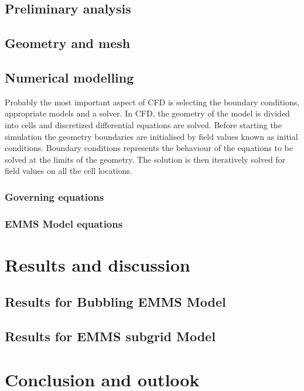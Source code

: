 \documentclass[sprache=english,doktyp=marbeit,fontsize=12pt]{TUBAFarbeiten}
\begin{document}
\subsection{Preliminary analysis}

\subsection{Geometry and mesh}


\subsection{Numerical modelling}

Probably the most important aspect of CFD is selecting the  boundary conditions, appropriate models and a solver. In CFD, the geometry of the model is divided into cells and discretized differential equations are solved. Before starting the simulation the geometry boundaries are initialised by field values known as initial conditions. Boundary conditions represents the behaviour of the equations to be solved at the limits of the geometry. The solution is then iteratively solved for field values on all the cell locations. 

\subsubsection{Governing equations}


\subsubsection{EMMS Model equations }

\pagebreak 

  
\pagebreak

\section{Results and discussion}

\subsection{Results for Bubbling EMMS Model}
\subsection{Results for EMMS subgrid Model}


\section{Conclusion and outlook}
\end{document}
